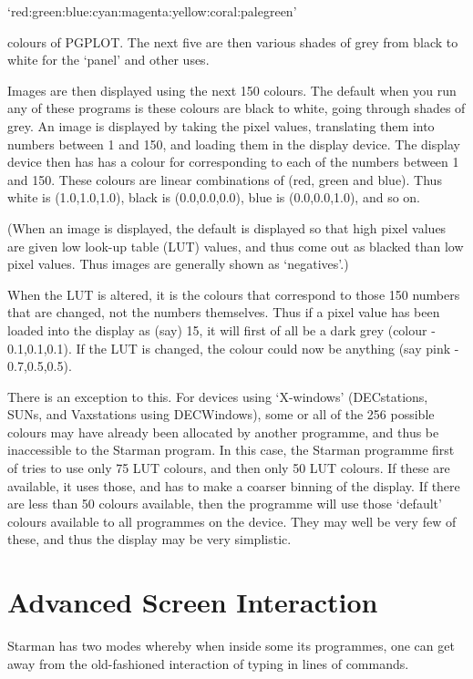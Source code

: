 `red:green:blue:cyan:magenta:yellow:coral:palegreen'

colours of PGPLOT. The next five are then various shades of grey from
black to white for the `panel' and other uses.

Images are then displayed using the next 150 colours. The default
when you run any of these programs is these colours are black to
white, going through shades of grey. An image is displayed by taking
the pixel values, translating them into numbers between 1 and 150,
and loading them in the display device. The display device then has
has a colour for corresponding to each of the numbers between 1 and
150. These colours are linear combinations of (red, green and blue).
Thus white is (1.0,1.0,1.0), black is (0.0,0.0,0.0), blue is
(0.0,0.0,1.0), and so on.

(When an image is displayed, the default is displayed so that high pixel
values are given low look-up table (LUT) values, and thus come out as
blacked than low pixel values. Thus images are generally shown as
`negatives'.) 

When the LUT is altered, it is the colours that correspond to those 150
numbers that are changed, not the numbers themselves. Thus if a pixel value
has been loaded into the display as (say) 15, it will first of all be a
dark grey (colour - 0.1,0.1,0.1). If the LUT is changed, the colour could
now be anything (say pink - 0.7,0.5,0.5). 

There is an exception to this. For devices using `X-windows' (DECstations,
SUNs, and Vaxstations using DECWindows), some or all of the 256 possible colours may
have already been allocated by another programme, and thus be inaccessible 
to the Starman program. In this case, the Starman programme first of tries
to use only 75 LUT colours, and then only 50 LUT colours. If these are 
available, it uses those, and has to make a coarser binning of the display.
If there are less than 50 colours available, then the programme will use
those `default' colours available to all programmes on the device. They may
well be very few of these, and thus the display may be very simplistic.

\section{Advanced Screen Interaction}
\label{se:advance}

Starman has two modes whereby when inside some its programmes, one can get
away from the old-fashioned interaction of typing in lines of commands.

